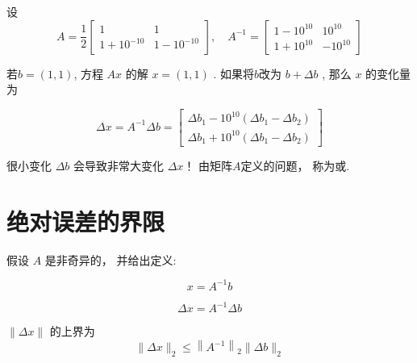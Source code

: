 \begin{example}
    设\begin{equation} A=\frac{1}{2}\left[\begin{array}{cc}1 & 1 \\ 1+10^{-10} & 1-10^{-10}\end{array}\right], \quad A^{-1}=\left[\begin{array}{cc}1-10^{10} & 10^{10} \\ 1+10^{10} & -10^{10}\end{array}\right] \end{equation}

若$ b=(1,1) $, 方程 $ A x $ 的解 $ x=(1,1) $ . 
如果将$b$改为 $ b+\Delta b $ , 那么 $ x $ 的变化量为

\begin{equation} \Delta x=A^{-1} \Delta b=\left[\begin{array}{l}\Delta b_{1}-10^{10}\left(\Delta b_{1}-\Delta b_{2}\right) \\ \Delta b_{1}+10^{10}\left(\Delta b_{1}-\Delta b_{2}\right)\end{array}\right] \end{equation}
\end{example}


很小变化 $ \Delta b $ 会导致非常大变化 $ \Delta x $！ 由矩阵$A$定义的问题， 称为或. 



\section{绝对误差的界限}

假设 $ A $ 是非奇异的， 并给出定义:

\begin{notation}
    \begin{equation} x=A^{-1} b\end{equation} 
    
    \begin{equation} \Delta x=A^{-1} \Delta b \end{equation}
\end{notation}

\begin{theorem}[绝对误差的界限]
    $ \|\Delta x\| $ 的上界为
    \begin{equation}
    \|\Delta x\|_{2} \leq\left\|A^{-1}\right\|_{2}\|\Delta b\|_{2}
    \end{equation}

\end{theorem}

